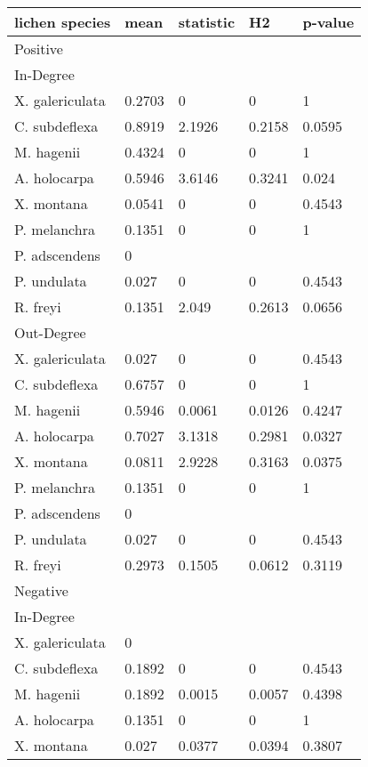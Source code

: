 \begin{table}[ht]
\centering
\begin{tabular}{lllll}
  \hline
lichen species & mean & statistic & H2 & p-value \\ 
  \hline
Positive &  &  &  &  \\ 
  In-Degree &  &  &  &  \\ 
  X. galericulata & 0.2703 & 0 & 0 & 1 \\ 
  C. subdeflexa & 0.8919 & 2.1926 & 0.2158 & 0.0595 \\ 
  M. hagenii & 0.4324 & 0 & 0 & 1 \\ 
  A. holocarpa & 0.5946 & 3.6146 & 0.3241 & 0.024 \\ 
  X. montana & 0.0541 & 0 & 0 & 0.4543 \\ 
  P. melanchra & 0.1351 & 0 & 0 & 1 \\ 
  P. adscendens & 0 &  &  &  \\ 
  P. undulata & 0.027 & 0 & 0 & 0.4543 \\ 
  R. freyi & 0.1351 & 2.049 & 0.2613 & 0.0656 \\ 
  Out-Degree &  &  &  &  \\ 
  X. galericulata & 0.027 & 0 & 0 & 0.4543 \\ 
  C. subdeflexa & 0.6757 & 0 & 0 & 1 \\ 
  M. hagenii & 0.5946 & 0.0061 & 0.0126 & 0.4247 \\ 
  A. holocarpa & 0.7027 & 3.1318 & 0.2981 & 0.0327 \\ 
  X. montana & 0.0811 & 2.9228 & 0.3163 & 0.0375 \\ 
  P. melanchra & 0.1351 & 0 & 0 & 1 \\ 
  P. adscendens & 0 &  &  &  \\ 
  P. undulata & 0.027 & 0 & 0 & 0.4543 \\ 
  R. freyi & 0.2973 & 0.1505 & 0.0612 & 0.3119 \\ 
  Negative &  &  &  &  \\ 
  In-Degree &  &  &  &  \\ 
  X. galericulata & 0 &  &  &  \\ 
  C. subdeflexa & 0.1892 & 0 & 0 & 0.4543 \\ 
  M. hagenii & 0.1892 & 0.0015 & 0.0057 & 0.4398 \\ 
  A. holocarpa & 0.1351 & 0 & 0 & 1 \\ 
  X. montana & 0.027 & 0.0377 & 0.0394 & 0.3807 \\ 

\end{tabular}
\end{table}
